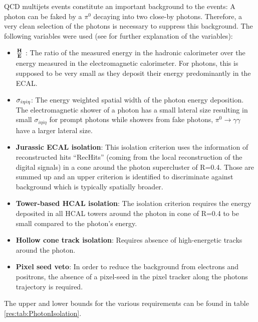 QCD multijets events constitute an important background to the \GAMJET events: A photon can be faked by a $\pi^{0}$ decaying into two close-by photons. 
Therefore, a very clean selection of the photons is necessary to suppress this background.
The following variables were used (see \cite{CMS-PAS-EGM-10-006} for further explanation of the variables):

\begin{itemize}
 \item $\boldmath{\frac{\textbf{H}}{\textbf{E}}}$ : The ratio of the measured energy in the hadronic calorimeter over the energy measured in the electromagnetic calorimeter. 
                                                    For photons, this is supposed to be very small as they deposit their energy predominantly in the ECAL.
 \item $\boldmath{\sigma_{i\eta i \eta}}$: The energy weighted spatial width of the photon energy deposition. The electromagnetic shower of a photon has a small lateral size 
                                           resulting in small $\sigma_{i\eta i \eta}$ for prompt photons while showers from fake photons, \eg $\pi^{0} \rightarrow \gamma \gamma$
                                           have a larger lateral size.
 \item \textbf{Jurassic ECAL isolation}: This isolation criterion uses the information of reconstructed hits ``RecHits'' (coming from the local reconstruction of the digital signals) 
                                         in a cone around the photon supercluster of R=0.4. Those are summed up and an upper criterion is identified to discriminate against 
                                         background which is typically spatially broader.  
 \item \textbf{Tower-based HCAL isolation}: The isolation criterion requires the energy deposited in all HCAL towers around the photon in cone of R=0.4 to be small compared to the 
                                            photon's energy. 
 \item \textbf{Hollow cone track isolation}: Requires absence of high-energetic tracks around the photon.
 \item \textbf{Pixel seed veto}: In order to reduce the background from electrons and positrons, the absence of a pixel-seed in the pixel tracker along the photons 
                                 trajectory is required.
\end{itemize}

The upper and lower bounds for the various requirements can be found in table \ref{res:tab:PhotonIsolation}. 

